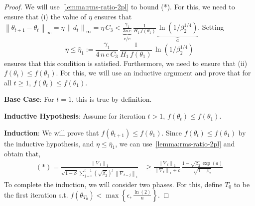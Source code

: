 \documentclass{article}
\newcommand{\norm}[1]{\left\|#1 \right\|}
\newcommand{\tht}{\theta_t}
\newcommand{\thtt}{\theta_{t+1}}
\begin{document}
\begin{proof}
We will use~\cref{lemma:rms-ratio-2pl} to bound (*). For this, we need to ensure that (i) the value of $\eta$ ensures that $\norm{\thtt - \tht}_\infty = \eta \, \norm{d_t}_{\infty} = \eta \, C_3 < \underbrace{\frac{\gamma_1}{3 n \, e}}_{c/e} \, \frac{1}{H_1 \, f(\theta_1)} \, \underbrace{\ln(1/\beta_2^{1/4})}_{a}$. Setting 
\[
\eta \leq \bar{\eta}_1 := \frac{\gamma_1 }{4 \, n \, e \, C_3} \, \frac{1}{H_1 \, f(\theta_1)} \, \ln(1/ \beta_2^{1/4})
\]
ensures that this condition is satisfied. Furthermore, we need to ensure that (ii) $f(\tht) \leq f(\theta_1)$. For this, we will use an inductive argument and prove that for all $t \geq 1$, $f(\tht) \leq f(\theta_1)$. 

\textbf{Base Case}: For $t = 1$, this is true by definition. 

\textbf{Inductive Hypothesis}: Assume for iteration $t > 1$, $f(\tht) \leq f(\theta_1)$.

\textbf{Induction}: We will prove that $f(\thtt) \leq f(\theta_1)$. Since $f(\tht) \leq f(\theta_1)$ by the inductive hypothesis, and $\eta \leq \bar{\eta}_1$, we can use~\cref{lemma:rms-ratio-2pl} and obtain that, 
\begin{align}
(*) = \frac{\norm{\nabla_t}_1}{\sqrt{1 - \beta} \, \sum_{j = 0}^{t-1} (\sqrt{\beta_2})^{j} \, \norm{\nabla_{t-j}}_1} & \geq \frac{\norm{\nabla_t}_1}{\norm{\nabla_t}_1 + c} \, \frac{1 - \sqrt{\beta_2} \, \exp(a)}{\sqrt{1 - \beta_2}}    \label{eq:adam-logreg-precond}
\end{align}
To complete the induction, we will consider two phases. For this, define $T_0$ to be the first iteration s.t. $f(\theta_{T_0}) < \max\left\{\epsilon, \frac{\ln(2)}{n}\right\}$. 



\end{proof}
\end{document}
